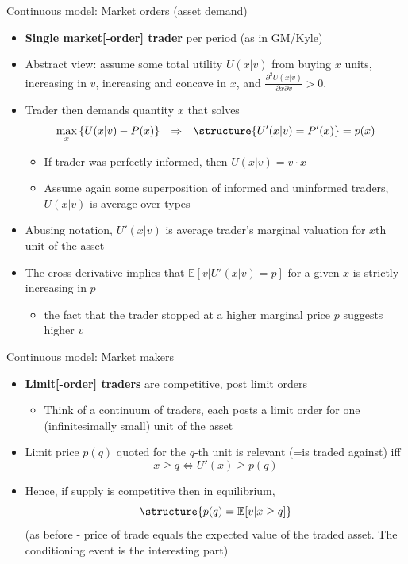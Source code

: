 \documentclass[english,10pt
,aspectratio=169
]{beamer}
\begin{document}
\begin{frame}{Continuous model: Market orders (asset demand)}
	\begin{itemize}
		\item \textbf{Single market[-order] trader} per period (as in GM/Kyle)
		\item Abstract view: assume some total utility $U(x|v)$ from buying $x$ units, increasing in $v$, increasing and concave in $x$, and $\frac{\partial^2 U(x|v)}{\partial x \partial v} > 0$.
		\item Trader then \alert{demands quantity $x$} that solves
		\begin{align*}
			\max_{x} \left\{ U(x|v) - P(x) \right\}
			&&
			\Rightarrow
			&&
			\structure{U'(x|v) = P'(x)} = p(x)
		\end{align*}\vspace{-0.6cm}
		\begin{itemize}
			\item If trader was perfectly informed, then $U(x|v) = v \cdot x$
			\item Assume again some superposition of informed and uninformed traders, $U(x|v)$ is average over types
		\end{itemize}
		\item Abusing notation, $U'(x|v)$ is average trader's marginal valuation for $x$th unit of the asset
		\item The cross-derivative implies that $\mathbb{E}[v|U'(x|v) = p]$ for a given $x$ is strictly increasing in $p$
		\begin{itemize}
			\item the fact that the trader stopped at a higher marginal price $p$ suggests higher $v$
		\end{itemize}
	\end{itemize}
\end{frame}


\begin{frame}{Continuous model: Market makers}
\begin{itemize}	
	\item \textbf{Limit[-order] traders} are competitive, post limit orders
	\begin{itemize}
		\item Think of a continuum of traders, each posts a limit order for one (infinitesimally small) unit of the asset
	\end{itemize}
	\item Limit price $p(q)$ quoted for the $q$-th unit is relevant (=is traded against) iff $$x \geq q \iff U'(x) \geq p(q)$$
	\item Hence, if supply is competitive then in equilibrium,
	\[
	\structure{p(q) = \mathbb{E}[v| x \geq q]}
	\]
	(as before - price of trade equals the expected value of the traded asset. The conditioning event is the interesting part)
\end{itemize}
\end{frame}
\end{document}
